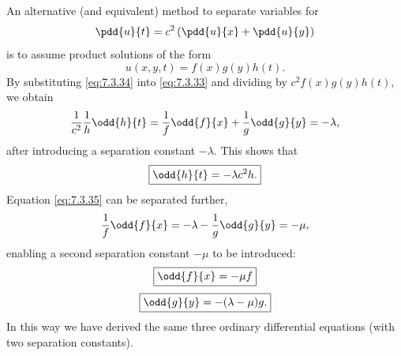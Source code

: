 An alternative (and equivalent) method to separate variables for
\begin{equation}
\pdd{u}{t} = c^2\left(\pdd{u}{x} + \pdd{u}{y}\right)
\label{eq:7.3.33}
\end{equation}
is to assume product solutions of the form
\begin{equation}
u(x,y,t) = f(x)g(y)h(t).
\label{eq:7.3.34}
\end{equation}
By substituting \eqref{eq:7.3.34} into \eqref{eq:7.3.33} and dividing by $c^2 f(x)g(y)h(t)$, we obtain
\begin{equation}
\frac{1}{c^2}\frac{1}{h}\odd{h}{t} = \frac{1}{f}\odd{f}{x} + \frac{1}{g}\odd{g}{y} = -\lambda,
\label{eq:7.3.35}
\end{equation}
after introducing a separation constant $-\lambda$.  This shows that
\begin{equation}
\boxed{\odd{h}{t} = -\lambda c^2 h.}
\label{eq:7.3.36}
\end{equation}
Equation \eqref{eq:7.3.35} can be separated further,
\begin{equation}
\frac{1}{f}\odd{f}{x} = -\lambda - \frac{1}{g}\odd{g}{y} = -\mu,
\label{eq:7.3.37}
\end{equation}
enabling a second separation constant $-\mu$ to be introduced:
\begin{equation}
\boxed{\odd{f}{x} = -\mu f}
\label{eq:7.3.38}
\end{equation}
\begin{equation}
\boxed{\odd{g}{y} = -(\lambda - \mu)g.}
\label{eq:7.3.39}
\end{equation}
In this way we have derived the same three ordinary differential equations (with two separation constants).
